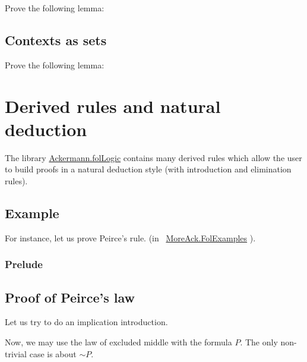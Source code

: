 \begin{exercise}

Prove the following lemma:

\end{exercise}

\subsection{Contexts as sets}

\begin{exercise}

Prove the following lemma:

\end{exercise}


\section{Derived rules and natural deduction}


 The library 
 \href{../theories/html/hydras.Ackermann.folLogic.html}{Ackermann.folLogic} contains many derived rules which allow the user to build proofs in a natural deduction style (with introduction and elimination rules).

\subsection{Example}

For instance, let us prove Peirce's rule.
 (in  ~\href{../theories/html/hydras.MoreAck.FolExamples.html}{MoreAck.FolExamples} ).

\subsubsection{Prelude}



\subsection{Proof of Peirce's law}



Let us try to do an implication introduction.


Now, we may use the law of excluded middle with the formula $P$. The only non-trivial case is about $\sim P$.


